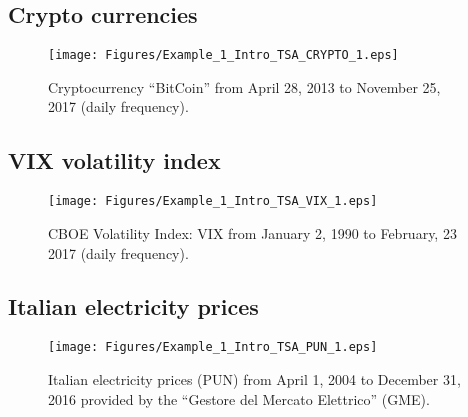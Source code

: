 \documentclass[
paper=128mm:96mm, %
fontsize=9.5pt, %
pagesize, %
parskip=half-, %
]{scrartcl} %
\def\qmo{``}
\def\qmcsp{'' }
\theoremstyle{mythmstyle} %
\def\qmo{``}
\def\qmcsp{'' }
\begin{document}
\subsection{Crypto currencies}
\begin{figure}[!h]
\begin{center}
%
\texttt{[image: Figures/Example\_1\_Intro\_TSA\_CRYPTO\_1.eps]}
%
\caption{\footnotesize{Cryptocurrency \qmo BitCoin\qmcsp from April 28, 2013 to November 25, 2017 (daily frequency). }}
%
\label{fig:apple_1}
%
\end{center}
\end{figure}
%
\clearpage

%
\subsection{VIX volatility index}
\begin{figure}[!h]
\begin{center}
%
\texttt{[image: Figures/Example\_1\_Intro\_TSA\_VIX\_1.eps]}
%
\caption{\footnotesize{CBOE Volatility Index: VIX from January 2, 1990 to February, 23 2017 (daily frequency). }}
%
\label{fig:DTB6_1}
%
\end{center}
\end{figure}
%
\clearpage

%
\subsection{Italian electricity prices}
\begin{figure}[!h]
\begin{center}
%
\texttt{[image: Figures/Example\_1\_Intro\_TSA\_PUN\_1.eps]}
%
\caption{\footnotesize{Italian electricity prices (PUN) from April 1, 2004 to December 31, 2016 provided by the \qmo Gestore del Mercato Elettrico\qmcsp (GME). }}
%
\label{fig:GME_3D}
%
\end{center}
\end{figure}
%
\clearpage
\end{document}
